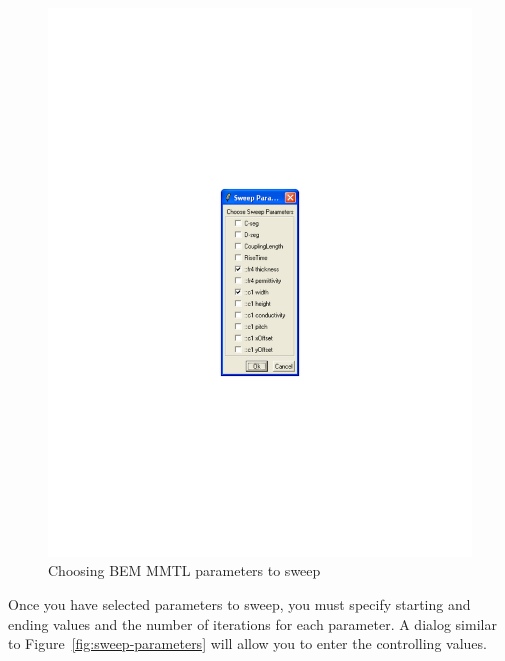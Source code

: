 \documentclass{article}
\begin{document}
\begin{figure}[hbt]
\begin{center}\includegraphics[scale=0.5]{sweep-select}\end{center}
\caption { Choosing BEM MMTL parameters to sweep }
\label{fig:sweep-select}
\end{figure}

Once you have selected parameters to sweep, you must specify starting
and ending values and the number of iterations for each parameter.  A
dialog similar to Figure~\ref{fig:sweep-parameters} will allow you to
enter the controlling values.
\end{document}
